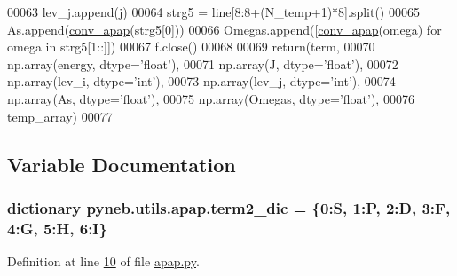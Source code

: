 \begin{DoxyCode}
00063             lev\_j.append(j)
00064             strg5 = line[8:8+(N\_temp+1)*8].split()
00065             As.append(\hyperlink{namespacepyneb_1_1utils_1_1apap_ad78f65e1ca140daa8a34fd88a91db97a}{conv\_apap}(strg5[0]))
00066             Omegas.append([\hyperlink{namespacepyneb_1_1utils_1_1apap_ad78f65e1ca140daa8a34fd88a91db97a}{conv\_apap}(omega) \textcolor{keywordflow}{for} omega \textcolor{keywordflow}{in} strg5[1::]])
00067     f.close()
00068     
00069     return(term, 
00070            np.array(energy, dtype=\textcolor{stringliteral}{'float'}), 
00071            np.array(J, dtype=\textcolor{stringliteral}{'float'}), 
00072            np.array(lev\_i, dtype=\textcolor{stringliteral}{'int'}), 
00073            np.array(lev\_j, dtype=\textcolor{stringliteral}{'int'}), 
00074            np.array(As, dtype=\textcolor{stringliteral}{'float'}), 
00075            np.array(Omegas, dtype=\textcolor{stringliteral}{'float'}), 
00076            temp\_array)
00077 
\end{DoxyCode}


\subsection{Variable Documentation}
\hypertarget{namespacepyneb_1_1utils_1_1apap_aba49aa2681eafa29fc85cb550e4ce28a}{}
\subsubsection[{term2\+\_\+dic}]{\setlength{\rightskip}{0pt plus 5cm}dictionary pyneb.\+utils.\+apap.\+term2\+\_\+dic = \{\textquotesingle{}0\textquotesingle{}\+:\textquotesingle{}S\textquotesingle{}, \textquotesingle{}1\textquotesingle{}\+:\textquotesingle{}P\textquotesingle{}, \textquotesingle{}2\textquotesingle{}\+:\textquotesingle{}D\textquotesingle{}, \textquotesingle{}3\textquotesingle{}\+:\textquotesingle{}F\textquotesingle{}, \textquotesingle{}4\textquotesingle{}\+:\textquotesingle{}G\textquotesingle{}, \textquotesingle{}5\textquotesingle{}\+:\textquotesingle{}H\textquotesingle{}, \textquotesingle{}6\textquotesingle{}\+:\textquotesingle{}I\textquotesingle{}\}}\label{namespacepyneb_1_1utils_1_1apap_aba49aa2681eafa29fc85cb550e4ce28a}


Definition at line \hyperlink{apap_8py_source_l00010}{10} of file \hyperlink{apap_8py_source}{apap.\+py}.

